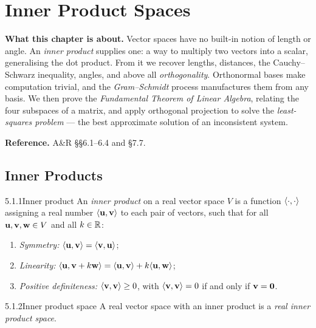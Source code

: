 \chapter{Inner Product Spaces}
\label{ch:inner-products}

\begin{roadmap}
\noindent\textbf{What this chapter is about.}\;
Vector spaces have no built-in notion of length or angle. An \emph{inner product} supplies one: a way to multiply two vectors into a scalar, generalising the dot product. From it we recover lengths, distances, the Cauchy--Schwarz inequality, angles, and above all \emph{orthogonality}. Orthonormal bases make computation trivial, and the \emph{Gram--Schmidt} process manufactures them from any basis. We then prove the \emph{Fundamental Theorem of Linear Algebra}, relating the four subspaces of a matrix, and apply orthogonal projection to solve the \emph{least-squares problem} --- the best approximate solution of an inconsistent system.
\medskip

\noindent\textbf{Reference.}\; A\&R \S\S6.1--6.4 and \S7.7.
\end{roadmap}

\section{Inner Products}
\label{sec:5.1}

\begin{defns}{5.1.1}{Inner product}
An \emph{inner product} on a real vector space $V$ is a function $\langle \cdot, \cdot \rangle$ assigning a real number $\langle \mathbf{u}, \mathbf{v} \rangle$ to each pair of vectors, such that for all $\mathbf{u},\mathbf{v},\mathbf{w}\in V$ and all $k\in\mathbb{R}$:
\begin{enumerate}[label=\arabic*.,leftmargin=2.2em,itemsep=1pt]
\item \emph{Symmetry:} $\langle \mathbf{u}, \mathbf{v} \rangle=\langle \mathbf{v}, \mathbf{u} \rangle$;
\item \emph{Linearity:} $\langle \mathbf{u}, \mathbf{v}+k\mathbf{w} \rangle=\langle \mathbf{u}, \mathbf{v} \rangle+k\langle \mathbf{u}, \mathbf{w} \rangle$;
\item \emph{Positive definiteness:} $\langle \mathbf{v}, \mathbf{v} \rangle\ge0$, with $\langle \mathbf{v}, \mathbf{v} \rangle=0$ if and only if $\mathbf{v}=\mathbf{0}$.
\end{enumerate}
\end{defns}

\begin{defns}{5.1.2}{Inner product space}
A real vector space with an inner product is a \emph{real inner product space}.
\end{defns}


